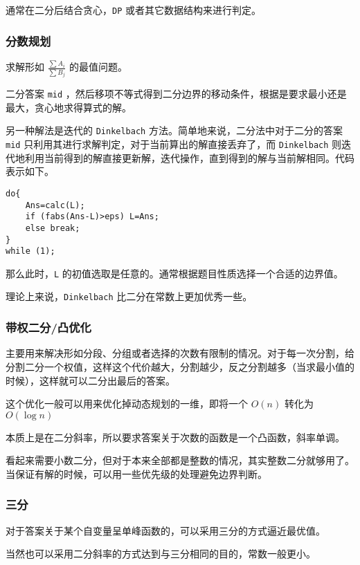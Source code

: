 \documentclass[UTF-8]{ctexart}
\begin{document}
	通常在二分后结合贪心，\texttt{DP} 或者其它数据结构来进行判定。
	
	\subsubsection{分数规划}
	
	求解形如 $\frac{\sum A_i}{\sum B_j}$ 的最值问题。
	
	二分答案 \texttt{mid} ，然后移项不等式得到二分边界的移动条件，根据是要求最小还是最大，贪心地求得算式的解。
	
	另一种解法是迭代的 \texttt{Dinkelbach} 方法。简单地来说，二分法中对于二分的答案 \texttt{mid} 只利用其进行求解判定，对于当前算出的解直接丢弃了，而 \texttt{Dinkelbach} 则迭代地利用当前得到的解直接更新解，迭代操作，直到得到的解与当前解相同。代码表示如下。
\begin{verbatim}
do{
    Ans=calc(L);
    if (fabs(Ans-L)>eps) L=Ans;
    else break;
}
while (1);
\end{verbatim}
	
	那么此时，\texttt{L} 的初值选取是任意的。通常根据题目性质选择一个合适的边界值。
	
	理论上来说，\texttt{Dinkelbach} 比二分在常数上更加优秀一些。
	
	\subsubsection{带权二分/凸优化}
	
	主要用来解决形如分段、分组或者选择的次数有限制的情况。对于每一次分割，给分割二分一个权值，这样这个代价越大，分割越少，反之分割越多（当求最小值的时候），这样就可以二分出最后的答案。
	
	这个优化一般可以用来优化掉动态规划的一维，即将一个 $O(n)$ 转化为 $O(\log n)$
	
	本质上是在二分斜率，所以要求答案关于次数的函数是一个凸函数，斜率单调。
	
	看起来需要小数二分，但对于本来全部都是整数的情况，其实整数二分就够用了。当保证有解的时候，可以用一些优先级的处理避免边界判断。
	
	\subsubsection{三分}
	
	对于答案关于某个自变量呈单峰函数的，可以采用三分的方式逼近最优值。
	
	当然也可以采用二分斜率的方式达到与三分相同的目的，常数一般更小。
	
\end{document}

